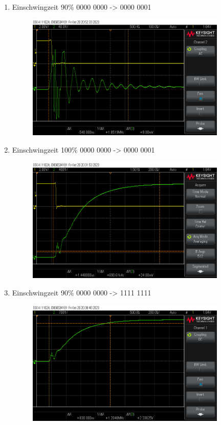 
\addchap{\langanhang}

 

{\Large
\begin{enumerate}[label=\Alph*.]
	\item Einschwingzeit 90\% 0000 0000 -> 0000 0001
	\begin{figure}[H]
		\centering
		\includegraphics[height=6cm]{images/einschwingszeit00000000-00000001_90proz.png}
	\end{figure}
	\item Einschwingzeit 100\% 0000 0000 -> 0000 0001
	\begin{figure}[H]
		\centering
		\includegraphics[height=6cm]{images/einschwingszeit00000000-11111111_100proz.png}
	\end{figure}
	\pagebreak
	\item Einschwingzeit 90\% 0000 0000 -> 1111 1111
	\begin{figure}[H]
		\centering
		\includegraphics[height=6cm]{images/enschwingszeit00000000-11111111_90proz.png} 

\end{figure}
\end{enumerate}}
